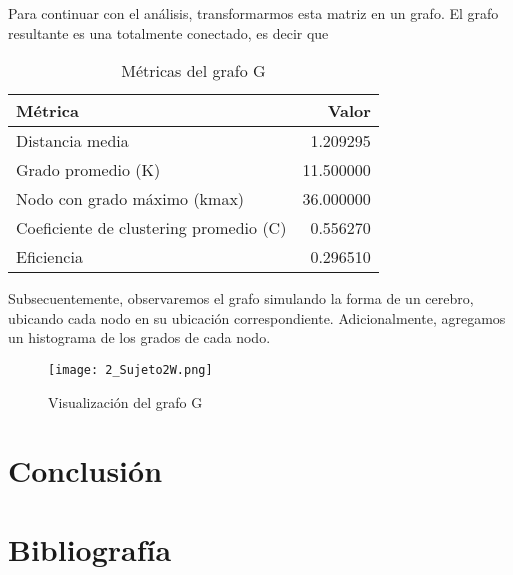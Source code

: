 \documentclass{article}
\begin{document}
Para continuar con el análisis, transformarmos esta matriz en un grafo. El
grafo resultante es una totalmente conectado, es decir que 

\begin{table}[h]
  \centering
  \begin{tabular}{lr}
      \toprule
      Métrica & Valor \\
      \midrule
      Distancia media & 1.209295 \\
      Grado promedio (K) & 11.500000 \\
      Nodo con grado máximo (kmax) & 36.000000 \\
      Coeficiente de clustering promedio (C) & 0.556270 \\
      Eficiencia & 0.296510 \\
      \bottomrule
      \end{tabular}
  \caption{Métricas del grafo G}
  \label{tab:parametros}
\end{table}

Subsecuentemente, observaremos el grafo simulando la forma de un cerebro,
ubicando cada nodo en su ubicación correspondiente. Adicionalmente, agregamos
un histograma de los grados de cada nodo.

\begin{figure}[H]
  \centering  
  \texttt{[image: 2\_Sujeto2W.png]}
  \caption{Visualización del grafo G}
\end{figure}

\section{Conclusión}

\section{Bibliografía}
\end{document}
